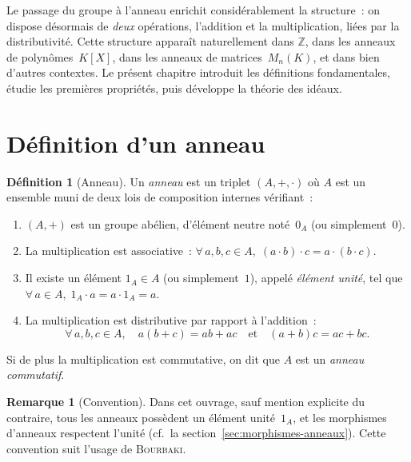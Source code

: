 \documentclass[12pt,a4paper,openany]{book}
\theoremstyle{definition}
\newtheorem{definition}{Définition}[chapter]
\newtheorem{remarque}{Remarque}[chapter]
\newcommand{\Z}{\mathbb{Z}}
\begin{document}
Le passage du groupe à l'anneau enrichit considérablement la structure~:
on dispose désormais de \emph{deux} opérations, l'addition et la
multiplication, liées par la distributivité. Cette structure apparaît
naturellement dans $\Z$, dans les anneaux de polynômes~$K[X]$, dans
les anneaux de matrices~$M_n(K)$, et dans bien d'autres contextes.
Le présent chapitre introduit les définitions fondamentales, étudie
les premières propriétés, puis développe la théorie des idéaux.

\section{Définition d'un anneau}\label{sec:def-anneau}

\begin{definition}[Anneau]\label{def:anneau}
Un \emph{anneau} est un triplet $(A, +, \cdot)$ où $A$ est
un ensemble muni de deux lois de composition internes vérifiant~:
\begin{enumerate}[label=\textup{(A\arabic*)}]
  \item\label{ax:A1} $(A, +)$ est un groupe abélien, d'élément neutre
        noté~$0_A$ (ou simplement~$0$).
  \item\label{ax:A2} La multiplication est associative~:
        $\forall\, a,b,c \in A,\; (a \cdot b) \cdot c = a \cdot (b \cdot c)$.
  \item\label{ax:A3} Il existe un élément $1_A \in A$ (ou simplement~$1$),
        appelé \emph{élément unité}, tel que
        $\forall\, a \in A,\; 1_A \cdot a = a \cdot 1_A = a$.
  \item\label{ax:A4} La multiplication est distributive par rapport à
        l'addition~:
        \[
          \forall\, a,b,c \in A,\quad
          a(b+c) = ab + ac \quad\text{et}\quad (a+b)c = ac + bc.
        \]
\end{enumerate}
Si de plus la multiplication est commutative, on dit que $A$ est un
\emph{anneau commutatif}.
\end{definition}

\begin{remarque}[Convention]\label{rem:convention-unite}
Dans cet ouvrage, sauf mention explicite du contraire, tous les anneaux
possèdent un élément unité~$1_A$, et les morphismes d'anneaux respectent
l'unité (cf.\ la section~\ref{sec:morphismes-anneaux}). Cette convention
suit l'usage de \textsc{Bourbaki}.
\end{remarque}
\end{document}

